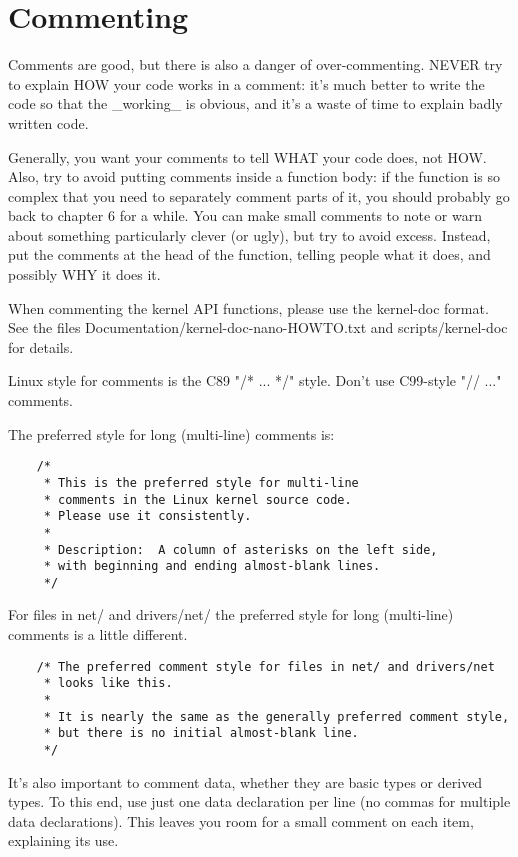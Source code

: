\documentclass[pdftex,12pt, twocol]{article} %
\begin{document}
\section{Commenting}

Comments are good, but there is also a danger of over-commenting.  NEVER
try to explain HOW your code works in a comment: it's much better to
write the code so that the \_working\_ is obvious, and it's a waste of
time to explain badly written code.

Generally, you want your comments to tell WHAT your code does, not HOW.
Also, try to avoid putting comments inside a function body: if the
function is so complex that you need to separately comment parts of it,
you should probably go back to chapter 6 for a while.  You can make
small comments to note or warn about something particularly clever (or
ugly), but try to avoid excess.  Instead, put the comments at the head
of the function, telling people what it does, and possibly WHY it does
it.

When commenting the kernel API functions, please use the kernel-doc format.
See the files Documentation/kernel-doc-nano-HOWTO.txt and scripts/kernel-doc
for details.

Linux style for comments is the C89 "/* ... */" style.
Don't use C99-style "// ..." comments.

The preferred style for long (multi-line) comments is:

\begin{verbatim}
	/*
	 * This is the preferred style for multi-line
	 * comments in the Linux kernel source code.
	 * Please use it consistently.
	 *
	 * Description:  A column of asterisks on the left side,
	 * with beginning and ending almost-blank lines.
	 */
\end{verbatim}

For files in net/ and drivers/net/ the preferred style for long (multi-line)
comments is a little different.

\begin{verbatim}
	/* The preferred comment style for files in net/ and drivers/net
	 * looks like this.
	 *
	 * It is nearly the same as the generally preferred comment style,
	 * but there is no initial almost-blank line.
	 */
\end{verbatim}

It's also important to comment data, whether they are basic types or derived
types.  To this end, use just one data declaration per line (no commas for
multiple data declarations).  This leaves you room for a small comment on each
item, explaining its use.
\end{document}
